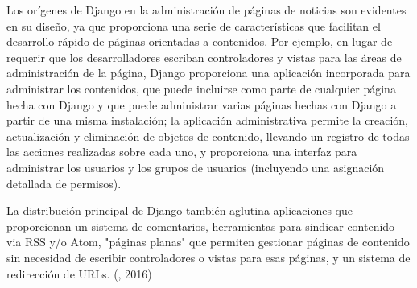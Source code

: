 Los orígenes de Django en la administración de páginas de noticias son evidentes en su diseño, ya que proporciona una serie de características que facilitan el desarrollo rápido de páginas orientadas a contenidos. Por ejemplo, en lugar de requerir que los desarrolladores escriban controladores y vistas para las áreas de administración de la página, Django proporciona una aplicación incorporada para administrar los contenidos, que puede incluirse como parte de cualquier página hecha con Django y que puede administrar varias páginas hechas con Django a partir de una misma instalación; la aplicación administrativa permite la creación, actualización y eliminación de objetos de contenido, llevando un registro de todas las acciones realizadas sobre cada uno, y proporciona una interfaz para administrar los usuarios y los grupos de usuarios (incluyendo una asignación detallada de permisos).

La distribución principal de Django también aglutina aplicaciones que proporcionan un sistema de comentarios, herramientas para sindicar contenido via RSS y/o Atom, "páginas planas" que permiten gestionar páginas de contenido sin necesidad de escribir controladores o vistas para esas páginas, y un sistema de redirección de URLs. (\citet{djangobib}, 2016) 

